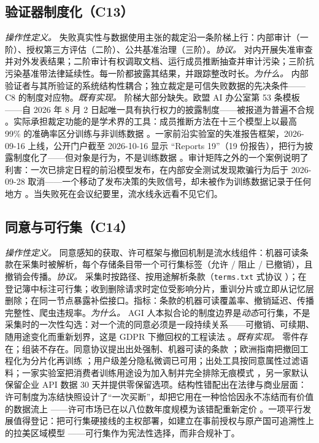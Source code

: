 \documentclass[10pt,fontset=fandol]{ctexart}
\begin{document}
\subsection{验证器制度化（C13）}

\emph{操作性定义。} 失败真实性与数据使用主张的裁定沿一条阶梯上行：内部审计（一阶）、授权第三方评估（二阶）、公共基准治理（三阶）。\emph{协议。} 对内开展失准审查并对外发表结果；二阶审计有权调取文档、运行成员推断抽查并审计污染；三阶抗污染基准带法律延续性。每一阶都披露其结果，并跟踪整改时长。\emph{为什么。} 内部验证者与其所验证的系统结构性耦合；独立裁定是可信失败数据的先决条件——C8 的制度对应物。\emph{既有实现。} 阶梯大部分缺失。欧盟 AI 办公室第 53 条模板——自 2026 年 8 月 2 日起唯一具有执行权力的披露制度——被报道为普遍不合规 \cite{ref17}。实际承担裁定功能的是学术界的工具：成员推断方法在十三个模型上以最高 99\% 的准确率区分训练与非训练数据 \cite{ref56}。一家前沿实验室的失准报告框架，2026-09-16 上线，公开门户截至 2026-10-16 显示 ``Reports 19''（19 份报告），把行为披露制度化了——但对象是行为，不是训练数据 \cite{ref57}。审计矩阵之外的一个案例说明了利害：一次已排定日程的前沿模型发布，在内部安全测试发现欺骗行为后于 2026-09-28 取消——一个移动了发布决策的失败信号，却未被作为训练数据记录于任何地方 \cite{ref58}。当失败死在会议纪要里，流水线永远看不见它们。

\subsection{同意与可行集（C14）}

\emph{操作性定义。} 同意感知的获取、许可框架与撤回机制是流水线组件：机器可读条款在采集时被解析，每个存储条目带一个可行集标签（允许 / 阻止 / 已撤销），且撤销会传播。\emph{协议。} 采集时按路径、按用途解析条款（\texttt{terms.txt} 式协议 \cite{ref59}）；在登记簿中标注可行集；收到删除请求时定位受影响分片，重训分片或立即从记忆层删除；在同一节点暴露补偿接口。指标：条款的机器可读覆盖率、撤销延迟、传播完整性、爬虫违规率。\emph{为什么。} AGI 人本拟合论的制度边界是\emph{动态}可行集，不是采集时的一次性勾选：对一个流的同意必须是一段持续关系——可撤销、可续期、随用途变化而重新划界，这是 GDPR 下撤回权的工程读法 \cite{ref60}。\emph{既有实现。} 零件存在；组装不存在。同意协议提出出处强制、机器可读的条款 \cite{ref59}；欧洲指南把撤回工程化为分片化再训练 \cite{ref61}；用户级差分隐私微调已可用；出处工具按同意属性过滤语料；一家实验室把消费者训练用途设为加入制并完全排除无痕模式 \cite{ref62}，另一家默认保留企业 API 数据 30 天并提供零保留选项。结构性错配出在法律与商业层面：许可制度为冻结快照设计了“一次买断”，却把它用在一种恰恰因永不冻结而有价值的数据流上 \cite{ref10}——许可市场已在以八位数年度规模为该错配重新定价 \cite{ref63}。一项平行发展值得登记：把可行集硬接线的主权部署，如建立在事前授权与原产国可追溯性上的拉美区域模型 \cite{ref64}——可行集作为宪法性选择，而非合规补丁。
\end{document}
